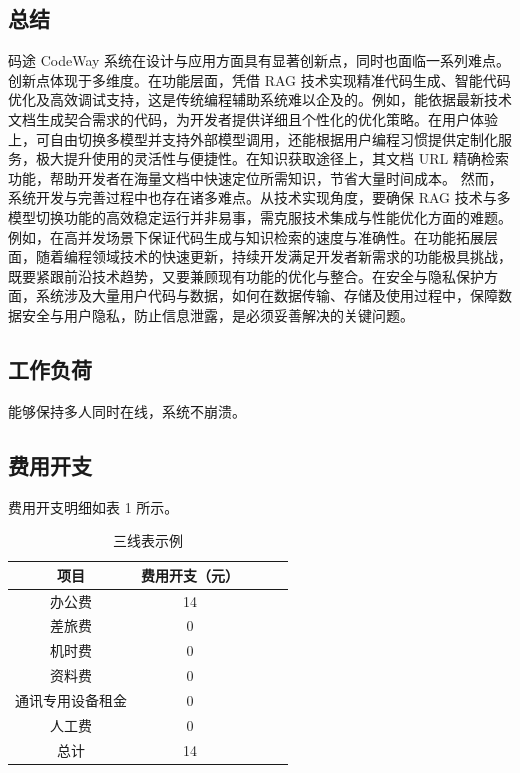 \documentclass[
    report,     %
    oneside,    %
    UTF8,       %
    zihao=-4    %
]{config} %
\begin{document}
\subsection{总结}
码途 CodeWay 系统在设计与应用方面具有显著创新点，同时也面临一系列难点。
创新点体现于多维度。在功能层面，凭借 RAG 技术实现精准代码生成、智能代码优化及高效调试支持，这是传统编程辅助系统难以企及的。例如，能依据最新技术文档生成契合需求的代码，为开发者提供详细且个性化的优化策略。在用户体验上，可自由切换多模型并支持外部模型调用，还能根据用户编程习惯提供定制化服务，极大提升使用的灵活性与便捷性。在知识获取途径上，其文档 URL 精确检索功能，帮助开发者在海量文档中快速定位所需知识，节省大量时间成本。
然而，系统开发与完善过程中也存在诸多难点。从技术实现角度，要确保 RAG 技术与多模型切换功能的高效稳定运行并非易事，需克服技术集成与性能优化方面的难题。例如，在高并发场景下保证代码生成与知识检索的速度与准确性。在功能拓展层面，随着编程领域技术的快速更新，持续开发满足开发者新需求的功能极具挑战，既要紧跟前沿技术趋势，又要兼顾现有功能的优化与整合。在安全与隐私保护方面，系统涉及大量用户代码与数据，如何在数据传输、存储及使用过程中，保障数据安全与用户隐私，防止信息泄露，是必须妥善解决的关键问题。
\subsection{工作负荷}
能够保持多人同时在线，系统不崩溃。
\subsection{费用开支}
费用开支明细如表 1 所示。
\begin{table}[H] %
    \centering %
    \caption{三线表示例} %
    \label{tab:three-line} %
    \renewcommand\arraystretch{0.85} %
    \setlength{\tabcolsep}{12pt} %
    \begin{tabular}{ccccc} %
        \toprule[1.5pt] %
        \textbf{项目} & \textbf{费用开支（元）} \\ %
        \midrule[0.8pt] %
            办公费 & 14 \\
            差旅费 & 0 \\
            机时费 & 0 \\
            资料费 & 0 \\
            通讯专用设备租金 & 0 \\
            人工费 & 0 \\
            总计 & 14 \\
        \hline\hline %
    \end{tabular}
\end{table}
\end{document}
